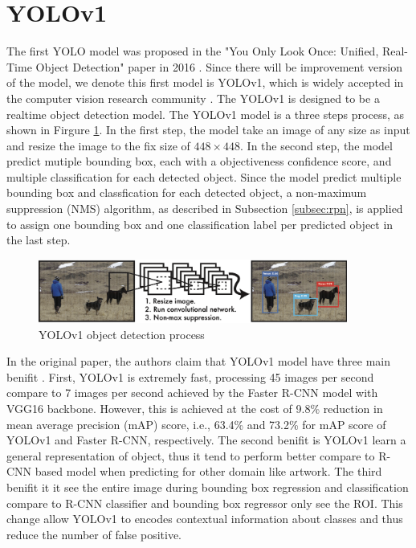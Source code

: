 \section{YOLOv1}  \label{sec:yolov1}

The first YOLO model was proposed in the "You Only Look Once: Uniﬁed, Real-Time Object Detection" paper in 2016 \cite{yolov1_2016}. Since there will be improvement version of the model, we denote this first model is YOLOv1, which is widely accepted in the computer vision research community \cite{understand_cnn_vs_yolo}. The YOLOv1 is designed to be a realtime object detection model. The YOLOv1 model is a three steps process, as shown in Firgure \ref{fig:yolov1_process}. In the first step, the model take an image of any size as input and resize the image to the fix size of $448 \times 448$. In the second step, the model predict mutiple bounding box, each with a objectiveness confidence score, and multiple classification for each detected object. Since the model predict multiple bounding box and classfication for each detected object, a non-maximum suppression (NMS) algorithm, as described in Subsection \ref{subsec:rpn}, is applied to assign one bounding box and one classification label per predicted object in the last step.

\begin{figure}[!ht]
    \centering
    \includegraphics[width=4in]{figures/yolov1_process.png}
    \caption{YOLOv1 object detection process \cite{yolov1_2016}} 
    \label{fig:yolov1_process}
\end{figure}

In the original paper, the authors claim that YOLOv1 model have three main benifit \cite{yolov1_2016}. First, YOLOv1 is extremely fast, processing 45 images per second compare to 7 images per second achieved by the Faster R-CNN model with VGG16 backbone. However, this is achieved at the cost of 9.8\% reduction in mean average precision (mAP) score, i.e., 63.4\% and 73.2\% for mAP score of YOLOv1 and Faster R-CNN, respectively. The second benifit is YOLOv1 learn a general representation of object, thus it tend to perform better compare to R-CNN based model when predicting for other domain like artwork. The third benifit it it see the entire image during bounding box regression and classification compare to R-CNN classifier and bounding box regressor only see the ROI. This change allow YOLOv1 to encodes contextual information about classes and thus reduce the number of false positive.

